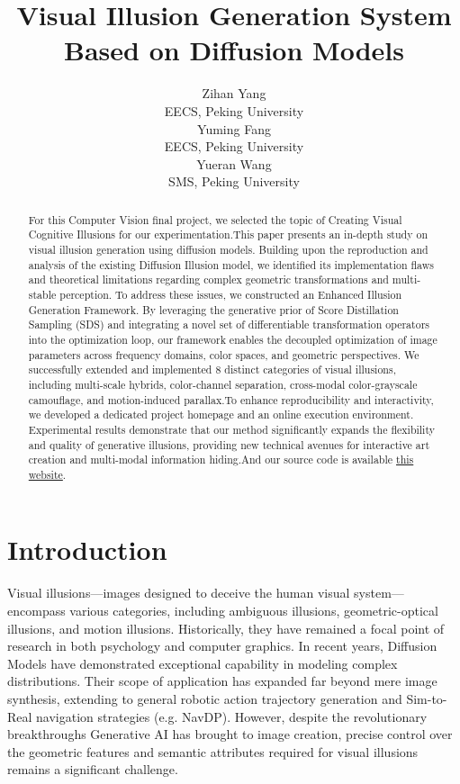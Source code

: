 \documentclass{article}
\title{Visual Illusion Generation System Based on Diffusion Models}
\author{%
  Zihan Yang \\
  EECS, Peking University \\
  \And
  Yuming Fang \\
  EECS, Peking University \\
  \And
  Yueran Wang \\
  SMS, Peking University \\
}
\begin{document}
\maketitle


\begin{abstract}
  For this Computer Vision final project, we selected the topic of Creating Visual
  Cognitive Illusions for our experimentation.This paper presents an in-depth study on visual illusion generation using diffusion models. Building upon the reproduction and analysis of the existing Diffusion Illusion model, we identified its implementation flaws and theoretical limitations regarding complex geometric transformations and multi-stable perception. To address these issues, we constructed an Enhanced Illusion Generation Framework. By leveraging the generative prior of Score Distillation Sampling (SDS) and integrating a novel set of differentiable transformation operators into the optimization loop, our framework enables the decoupled optimization of image parameters across frequency domains, color spaces, and geometric perspectives. We successfully extended and implemented 8 distinct categories of visual illusions, including multi-scale hybrids, color-channel separation, cross-modal color-grayscale camouflage, and motion-induced parallax.To enhance reproducibility and interactivity, we developed a dedicated project homepage and an online execution environment. Experimental results demonstrate that our method significantly expands the flexibility and quality of generative illusions, providing new technical avenues for interactive art creation and multi-modal information hiding.And our source code is available \href{https://github.com/smallyang688/Creating-Visual-Cognitive-Illusions}{this website}.
  
\end{abstract}


\section{Introduction}

Visual illusions—images designed to deceive the human visual system—encompass various categories, including ambiguous illusions, geometric-optical illusions, and motion illusions. Historically, they have remained a focal point of research in both psychology and computer graphics. In recent years, Diffusion Models have demonstrated exceptional capability in modeling complex distributions. Their scope of application has expanded far beyond mere image synthesis, extending to general robotic action trajectory generation\cite{chi2025diffusion} and Sim-to-Real navigation strategies (e.g. NavDP\cite{cai2025navdp}). However, despite the revolutionary breakthroughs Generative AI has brought to image creation, precise control over the geometric features and semantic attributes required for visual illusions remains a significant challenge.
\end{document}
